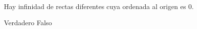 Hay infinidad de rectas diferentes cuya ordenada al origen es 0.

\begin{choices}
    \CorrectChoice Verdadero
    \choice Falso
\end{choices}